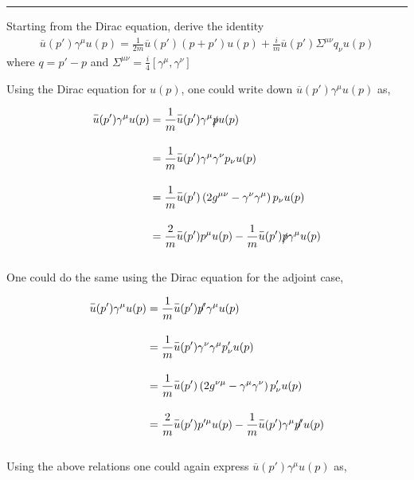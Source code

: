 \noindent\rule{7in}{1.5pt}


\begin{problem}{4.15}
Starting from the Dirac equation, derive the identity
\begin{align*}
    \overbar{u}  (p') \gamma^\mu u ( p ) = \frac{1}{2m} \overbar{u}(p') \left(p+p'\right) u(p) + \frac{i}{m} \overbar{u}\left(p'\right) \Sigma^{\mu\nu} q_\nu u(p)
\end{align*}
where $q = p'-p$ and $\Sigma^{\mu\nu}=\frac{i}{4}\left[ \gamma^\mu,\gamma^\nu \right]$
\end{problem}
\begin{solution}
Using the Dirac equation for $u(p)$, one could write down $\overbar{u}(p')\gamma^\mu u(p)$ as,

\begin{align}
    \overbar{u}(p')\gamma^\mu u(p) &= \frac{1}{m}  \overbar{u}(p')\gamma^\mu \slashed{p} u(p)  \label{4.15.1} \\[0.15in]
                                   &= \frac{1}{m}  \overbar{u}(p')\gamma^\mu \gamma^\nu p_\nu u(p) \nonumber \\[0.15in]
                                   &= \frac{1}{m}  \overbar{u}(p')\left( 2g^{\mu\nu} - \gamma^\nu \gamma^\mu \right) p_\nu u(p) \nonumber \\[0.15in]
                                   &= \frac{2}{m}  \overbar{u}(p') p^\mu  u(p) - \frac{1}{m}  \overbar{u}(p') \slashed{p} \gamma^\mu   u(p)    \label{4.15.2}
\end{align}\\
One could do the same using the Dirac equation for the adjoint case,

\begin{align}
    \overbar{u}(p')\gamma^\mu u(p) &= \frac{1}{m}  \overbar{u}(p')  \slashed{p'} \gamma^\mu u(p)  \label{4.15.3} \\[0.15in]
                                   &= \frac{1}{m}  \overbar{u}(p')\gamma^\nu \gamma^\mu p'_\nu u(p) \nonumber \\[0.15in]
                                   &= \frac{1}{m}  \overbar{u}(p')\left( 2g^{\nu\mu} - \gamma^\mu \gamma^\nu \right) p'_\nu u(p) \nonumber \\[0.15in]
                                   &= \frac{2}{m}  \overbar{u}(p') p'^\mu  u(p) - \frac{1}{m}  \overbar{u}(p') \gamma^\mu   \slashed{p'} u(p)   \label{4.15.4}
\end{align}\\
Using the above relations one could again express  $\overbar{u}(p')\gamma^\mu u(p)$ as,


\end{solution}
